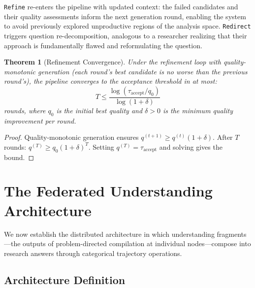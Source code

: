\documentclass[10pt,twocolumn]{article}
\newtheorem{theorem}{Theorem}[section]
\theoremstyle{definition}
\theoremstyle{remark}
\begin{document}
\texttt{Refine} re-enters the pipeline with updated context: the failed candidates and their quality assessments inform the next generation round, enabling the system to avoid previously explored unproductive regions of the analysis space. \texttt{Redirect} triggers question re-decomposition, analogous to a researcher realizing that their approach is fundamentally flawed and reformulating the question.

\begin{theorem}[Refinement Convergence]
\label{thm:refinement_convergence}
Under the refinement loop with quality-monotonic generation (each round's best candidate is no worse than the previous round's), the pipeline converges to the acceptance threshold in at most:
\begin{equation}
T \leq \frac{\log(\tau_{\text{accept}} / q_0)}{\log(1 + \delta)}
\end{equation}
rounds, where $q_0$ is the initial best quality and $\delta > 0$ is the minimum quality improvement per round.
\end{theorem}

\begin{proof}
Quality-monotonic generation ensures $q^{(t+1)} \geq q^{(t)}(1 + \delta)$. After $T$ rounds: $q^{(T)} \geq q_0(1 + \delta)^T$. Setting $q^{(T)} = \tau_{\text{accept}}$ and solving gives the bound.
\end{proof}

\section{The Federated Understanding Architecture}
\label{sec:federated}

We now establish the distributed architecture in which understanding fragments---the outputs of problem-directed compilation at individual nodes---compose into research answers through categorical trajectory operations.

\subsection{Architecture Definition}
\end{document}
